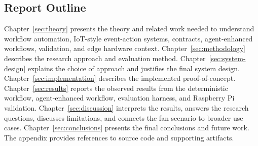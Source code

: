 \subsection{Report Outline}\label{subsec:outline}

Chapter~\ref{sec:theory} presents the theory and related work needed to understand workflow automation, IoT-style event-action systems, contracts, agent-enhanced workflows, validation, and edge hardware context. Chapter~\ref{sec:methodology} describes the research approach and evaluation method. Chapter~\ref{sec:system-design} explains the choice of approach and justifies the final system design. Chapter~\ref{sec:implementation} describes the implemented proof-of-concept. Chapter~\ref{sec:results} reports the observed results from the deterministic workflow, agent-enhanced workflow, evaluation harness, and Raspberry Pi validation. Chapter~\ref{sec:discussion} interprets the results, answers the research questions, discusses limitations, and connects the fan scenario to broader use cases. Chapter~\ref{sec:conclusions} presents the final conclusions and future work. The appendix provides references to source code and supporting artifacts.
